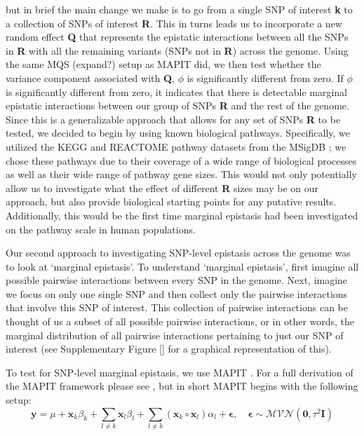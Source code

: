 \documentclass[12pt,a4paper]{article}
\begin{document}
but in brief the main change we make is to go from a single SNP of interest \textbf{k} to a collection of SNPs of interest \textbf{R}. This in turns leads us to incorporate a new random effect  \textbf{Q} that represents the epistatic interactions between all the SNPs in \textbf{R} with all the remaining variants (SNPs not in \textbf{R}) across the genome. Using the same MQS (expand?) \citep{Zhou2017} setup as MAPIT did, we then test whether the variance component associated with \textbf{Q}, $\phi$ is significantly different from zero. If $\phi$ is significantly different from zero, it indicates that there is detectable marginal epistatic interactions between our group of SNPs \textbf{R} and the rest of the genome. Since this is a generalizable approach that allows for any set of SNPs \textbf{R} to be tested, we decided to begin by using known biological pathways. Specifically, we utilized the KEGG and REACTOME pathway datasets from the MSigDB \citep{Liberzon2011}; we chose these pathways due to their coverage of a wide range of biological processes as well as their wide range of pathway gene sizes. This would not only potentially allow us to investigate what the effect of different \textbf{R} sizes may be on our approach, but also provide biological starting points for any putative results. Additionally, this would be the first time marginal epistasis had been investigated on the pathway scale in human populations.






Our second approach to investigating SNP-level epistasis across the genome was to look at `marginal epistasis'\citep{Crawford2017a}. To understand `marginal epistasis', first imagine all possible pairwise interactions between every SNP in the genome. Next, imagine we focus on only one single SNP and then collect only the pairwise interactions that involve this SNP of interest. This collection of pairwise interactions can be thought of us a subset of all possible pairwise interactions, or in other words, the marginal distribution of all pairwise interactions pertaining to just our SNP of interest (see Supplementary Figure \ref{} for a graphical representation of this).

To test for SNP-level marginal epistasis, we use MAPIT \citep{Crawford2017}. For a full derivation of the MAPIT framework please see \citet{Crawford2017}, but in short MAPIT begins with the following setup:
\begin{equation}
\textbf{y} = \mu + \textbf{x}_k\beta_k + \sum_{l \neq k} \textbf{x}_l\beta_l + \sum_{l \neq k} (\textbf{x}_k \circ \textbf{x}_l)\alpha_l + \boldsymbol{\epsilon}, \quad \boldsymbol{\epsilon} \sim \mathcal{MVN}(\textbf{0}, \tau^{2}\textbf{I})  
\end{equation}
\end{document}
